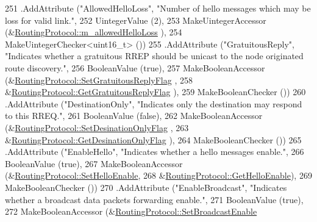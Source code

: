 \begin{DoxyCode}
251     .AddAttribute (\textcolor{stringliteral}{"AllowedHelloLoss"}, \textcolor{stringliteral}{"Number of hello messages which may be loss for valid link."},
252                    UintegerValue (2),
253                    MakeUintegerAccessor (&\hyperlink{classns3_1_1aodv_1_1RoutingProtocol_a80e1dc9b9a640570ba5d5270846a2f6f}{RoutingProtocol::m\_allowedHelloLoss}
      ),
254                    MakeUintegerChecker<uint16\_t> ())
255     .AddAttribute (\textcolor{stringliteral}{"GratuitousReply"}, \textcolor{stringliteral}{"Indicates whether a gratuitous RREP should be unicast to the node
       originated route discovery."},
256                    BooleanValue (\textcolor{keyword}{true}),
257                    MakeBooleanAccessor (&\hyperlink{classns3_1_1aodv_1_1RoutingProtocol_a87d5d76fac11f8d674cc599d71e6d3aa}{RoutingProtocol::SetGratuitousReplyFlag}
      ,
258                                         &\hyperlink{classns3_1_1aodv_1_1RoutingProtocol_a06777e1e90af0bf8badbc6e8664dda2c}{RoutingProtocol::GetGratuitousReplyFlag}
      ),
259                    MakeBooleanChecker ())
260     .AddAttribute (\textcolor{stringliteral}{"DestinationOnly"}, \textcolor{stringliteral}{"Indicates only the destination may respond to this RREQ."},
261                    BooleanValue (\textcolor{keyword}{false}),
262                    MakeBooleanAccessor (&\hyperlink{classns3_1_1aodv_1_1RoutingProtocol_accd8a8cfc59ed0990c938ddc630d2349}{RoutingProtocol::SetDesinationOnlyFlag}
      ,
263                                         &\hyperlink{classns3_1_1aodv_1_1RoutingProtocol_ae0852a1cb6bfda37aef7289a6df42582}{RoutingProtocol::GetDesinationOnlyFlag}
      ),
264                    MakeBooleanChecker ())
265     .AddAttribute (\textcolor{stringliteral}{"EnableHello"}, \textcolor{stringliteral}{"Indicates whether a hello messages enable."},
266                    BooleanValue (\textcolor{keyword}{true}),
267                    MakeBooleanAccessor (&\hyperlink{classns3_1_1aodv_1_1RoutingProtocol_aace3f902cf89b88cedd6cc64af35c912}{RoutingProtocol::SetHelloEnable},
268                                         &\hyperlink{classns3_1_1aodv_1_1RoutingProtocol_ab1efe83b7bbc5c2b262a71c54000ddba}{RoutingProtocol::GetHelloEnable}),
269                    MakeBooleanChecker ())
270     .AddAttribute (\textcolor{stringliteral}{"EnableBroadcast"}, \textcolor{stringliteral}{"Indicates whether a broadcast data packets forwarding enable."},
271                    BooleanValue (\textcolor{keyword}{true}),
272                    MakeBooleanAccessor (&\hyperlink{classns3_1_1aodv_1_1RoutingProtocol_a7b9ff3dbdf0a3cb34965fc271e311eff}{RoutingProtocol::SetBroadcastEnable}

\end{DoxyCode}
